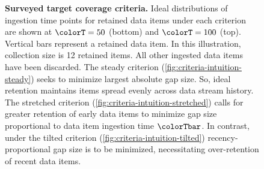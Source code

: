 \begin{figure}
    \begin{minipage}[]{\textwidth}
    \noindent{}%
    \hspace{-1.5ex}%
    {\vrule width 1pt}%
    \noindent{}%
    \hspace{-1ex}%
    {\vrule width 1pt}%
    \noindent{}%
    \hspace{-1ex}%
    {\vrule width 1pt}%
    \noindent{}%
    \end{minipage}
    \vspace{-0.15in}
    \caption{%
      \textbf{Surveyed target coverage criteria.}
      \footnotesize
      Ideal distributions of ingestion time points for retained data items under each criterion are shown at $\colorT=50$ (bottom) and $\colorT=100$ (top).
      Vertical bars represent a retained data item.
      In this illustration, collection size is 12 retained items.
      All other ingested data items have been discarded.
      The steady criterion (\ref{fig:criteria-intuition-steady}) seeks to minimize largest absolute gap size.
      So, ideal retention maintains items spread evenly across data stream history.
      The stretched criterion (\ref{fig:criteria-intuition-stretched}) calls for greater retention of early data items to minimize gap size proportional to data item ingestion time $\colorTbar$.
      In contrast, under the tilted criterion (\ref{fig:criteria-intuition-tilted}) recency-proportional gap size is to be minimized, necessitating over-retention of recent data items.
      }
    \label{fig:criteria-intuition}
\end{figure}
